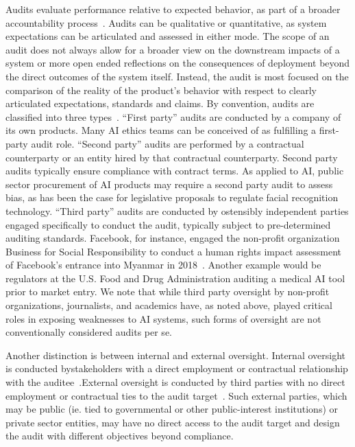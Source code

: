 \documentclass[sigconf]{acmart}
\begin{document}
Audits evaluate performance relative to expected behavior, as part of a broader accountability process~\cite{power1997audit}. Audits can be qualitative or quantitative, as system expectations can be articulated and assessed in either mode. The scope of an audit does not always allow for a broader view on the downstream impacts of a system or more open ended reflections on the consequences of deployment beyond the direct outcomes of the system itself. Instead, the audit is most focused on the comparison of the reality of the product's behavior with respect to clearly articulated expectations, standards and claims.
By convention, audits are classified into three types~\cite{cochran2015iso}. “First party” 
audits are conducted by a company of its own products. Many AI ethics teams can be conceived of as fulfilling a first-party audit role. “Second party” audits are performed by a contractual counterparty or an entity hired by that contractual counterparty. Second party audits typically ensure compliance with contract terms.
As applied to AI, public sector procurement of AI products may require a second party audit to assess bias, as has been the case for legislative proposals to regulate facial recognition technology. “Third party” audits are conducted by ostensibly independent parties engaged specifically to conduct the audit, typically subject to pre-determined auditing standards. Facebook, for instance, engaged the non-profit organization Business for Social Responsibility to conduct a human rights impact assessment of Facebook’s entrance into Myanmar in 2018~\cite{latonerohuman2021}. Another example would be regulators at the U.S. Food and Drug Administration auditing a medical AI tool prior to market entry. We note that while third party oversight by non-profit organizations, journalists, and academics have, as noted above, played critical roles in exposing weaknesses to AI systems, such forms of oversight are not conventionally considered audits per se. 

Another distinction is between internal and external oversight. Internal oversight is conducted bystakeholders with a direct employment or contractual relationship with the auditee~\cite{raji2020closing}.External oversight is conducted by third parties with no direct employment or contractual ties to the audit target~\cite{raji2019actionable}. Such external parties, which may be public (ie. tied to governmental or other public-interest institutions) or private sector entities, may have no direct access to the audit target and design the audit with different objectives beyond compliance.
\end{document}
